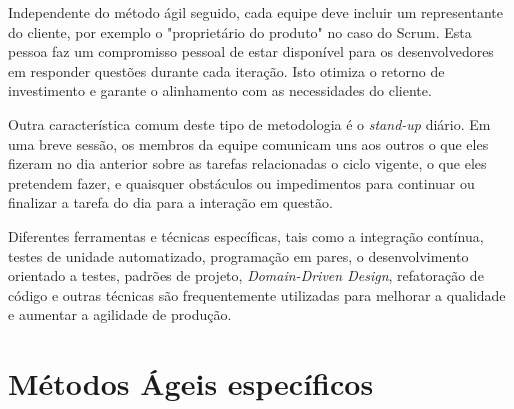 \par Independente do método ágil seguido, cada equipe deve incluir um representante do cliente, por exemplo o "proprietário do produto" no caso do Scrum. Esta pessoa faz um compromisso pessoal de estar disponível para os desenvolvedores em responder questões durante cada iteração. Isto otimiza o retorno de investimento e garante o alinhamento com as necessidades do cliente.
\par Outra característica comum deste tipo de metodologia é o \emph{stand-up} diário. Em uma breve sessão, os membros da equipe comunicam uns aos outros o que eles fizeram no dia anterior sobre as tarefas relacionadas o ciclo vigente, o que eles pretendem fazer, e quaisquer obstáculos ou impedimentos para continuar ou finalizar a tarefa do dia para a interação em questão.
\par Diferentes ferramentas e técnicas específicas, tais como a integração contínua, testes de unidade automatizado, programação em pares, o desenvolvimento orientado a testes, padrões de projeto, \emph{Domain-Driven Design}, refatoração de código e outras técnicas são frequentemente utilizadas para melhorar a qualidade e aumentar a agilidade de produção.

\section{Métodos Ágeis específicos}

